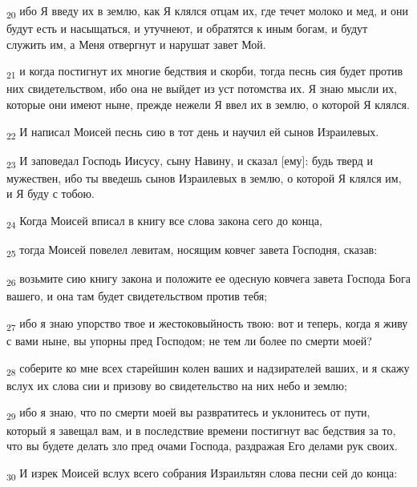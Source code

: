 \begin{tcolorbox}
\textsubscript{20} ибо Я введу их в землю, как Я клялся отцам их, где течет молоко и мед, и они будут есть и насыщаться, и утучнеют, и обратятся к иным богам, и будут служить им, а Меня отвергнут и нарушат завет Мой.
\end{tcolorbox}
\begin{tcolorbox}
\textsubscript{21} и когда постигнут их многие бедствия и скорби, тогда песнь сия будет против них свидетельством, ибо она не выйдет из уст потомства их. Я знаю мысли их, которые они имеют ныне, прежде нежели Я ввел их в землю, о которой Я клялся.
\end{tcolorbox}
\begin{tcolorbox}
\textsubscript{22} И написал Моисей песнь сию в тот день и научил ей сынов Израилевых.
\end{tcolorbox}
\begin{tcolorbox}
\textsubscript{23} И заповедал Господь Иисусу, сыну Навину, и сказал [ему]: будь тверд и мужествен, ибо ты введешь сынов Израилевых в землю, о которой Я клялся им, и Я буду с тобою.
\end{tcolorbox}
\begin{tcolorbox}
\textsubscript{24} Когда Моисей вписал в книгу все слова закона сего до конца,
\end{tcolorbox}
\begin{tcolorbox}
\textsubscript{25} тогда Моисей повелел левитам, носящим ковчег завета Господня, сказав:
\end{tcolorbox}
\begin{tcolorbox}
\textsubscript{26} возьмите сию книгу закона и положите ее одесную ковчега завета Господа Бога вашего, и она там будет свидетельством против тебя;
\end{tcolorbox}
\begin{tcolorbox}
\textsubscript{27} ибо я знаю упорство твое и жестоковыйность твою: вот и теперь, когда я живу с вами ныне, вы упорны пред Господом; не тем ли более по смерти моей?
\end{tcolorbox}
\begin{tcolorbox}
\textsubscript{28} соберите ко мне всех старейшин колен ваших и надзирателей ваших, и я скажу вслух их слова сии и призову во свидетельство на них небо и землю;
\end{tcolorbox}
\begin{tcolorbox}
\textsubscript{29} ибо я знаю, что по смерти моей вы развратитесь и уклонитесь от пути, который я завещал вам, и в последствие времени постигнут вас бедствия за то, что вы будете делать зло пред очами Господа, раздражая Его делами рук своих.
\end{tcolorbox}
\begin{tcolorbox}
\textsubscript{30} И изрек Моисей вслух всего собрания Израильтян слова песни сей до конца:
\end{tcolorbox}
